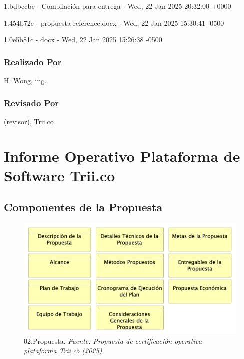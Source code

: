 \documentclass[
  paper=a4,
  ,captions=tableheading
]{scrartcl}
\renewenvironment{quote}{\begin{customblockquote}\list{}{\rightmargin=0em\leftmargin=0em}%
\item\relax\color{blockquote-text}\ignorespaces}{\unskip\unskip\endlist\end{customblockquote}}
\begin{document}
1.bdbccbe - Compilación para entrega - Wed, 22 Jan 2025 20:32:00 +0000

1.454b72e - propuesta-reference.docx - Wed, 22 Jan 2025 15:30:41 -0500

1.0e5b81c - docx - Wed, 22 Jan 2025 15:26:38 -0500

\subsubsection{Realizado Por}\label{sec:realizado-por}

H. Wong, ing.

\subsubsection{Revisado Por}\label{sec:revisado-por}

(revisor), Trii.co

\newpage

\section{Informe Operativo Plataforma de Software
Trii.co}\label{sec:informe-operativo-plataforma-de-software-trii.co}

\subsection{Componentes de la
Propuesta}\label{sec:componentes-de-la-propuesta}

\begin{quote}
\end{quote}

\begin{figure}
\centering
\includegraphics{images/02.Propuesta.png}
\caption{02.Propuesta. \emph{Fuente: Propuesta de certificación
operativa plataforma Trii.co
(2025)}}\label{fig:id-dd2f1c1c1816447380fe900b66faa8bc}
\end{figure}
\end{document}
